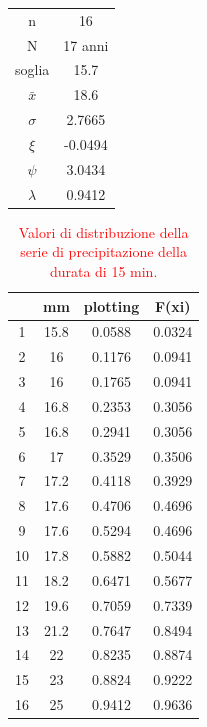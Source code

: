 \begin{table}[H]
\begin{minipage}{.5\linewidth}
        \begin{tabular}{cc}
            \toprule
            n        &    16     \\
            N        & 17 anni \\
            soglia   &     15.7    \\
            $\bar{x}$    &     18.6    \\
            $\sigma$ &     2.7665    \\
            $\xi$      &    -0.0494     \\
            $\psi$      &      3.0434   \\
            $\lambda$   &        0.9412  \\
        \bottomrule 
        \end{tabular}
    \end{minipage} 
\end{table}
    
\begin{table}[H] \centering
    \caption{\textcolor{red}{Valori di distribuzione della serie di precipitazione della durata di 15 min.}}
            \begin{tabular}{cccc}
                \toprule
               & mm   & plotting & F(xi)  \\
               \midrule
            1  & 15.8 & 0.0588   & 0.0324 \\
            2  & 16   & 0.1176   & 0.0941 \\
            3  & 16   & 0.1765   & 0.0941 \\
            4  & 16.8 & 0.2353   & 0.3056 \\
            5  & 16.8 & 0.2941   & 0.3056 \\
            6  & 17   & 0.3529   & 0.3506 \\
            7  & 17.2 & 0.4118   & 0.3929 \\
            8  & 17.6 & 0.4706   & 0.4696 \\
            9  & 17.6 & 0.5294   & 0.4696 \\
            10 & 17.8 & 0.5882   & 0.5044 \\
            11 & 18.2 & 0.6471   & 0.5677 \\
            12 & 19.6 & 0.7059   & 0.7339 \\
            13 & 21.2 & 0.7647   & 0.8494 \\
            14 & 22   & 0.8235   & 0.8874 \\
            15 & 23   & 0.8824   & 0.9222 \\
            16 & 25   & 0.9412   & 0.9636 \\
            \bottomrule
            \end{tabular}
\end{table}

